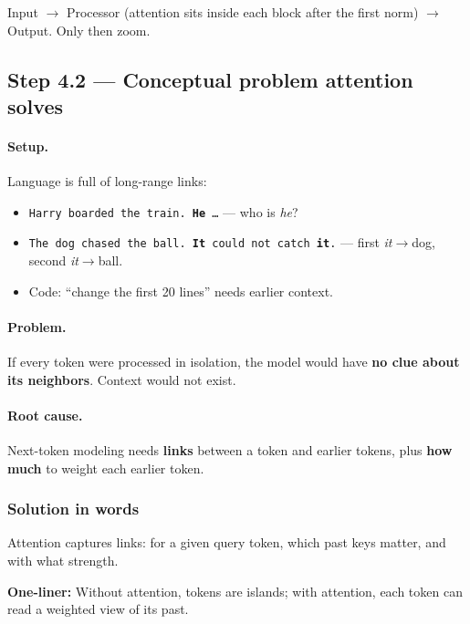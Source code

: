 \documentclass[11pt,a4paper]{article}
\begin{document}
Input $\rightarrow$ Processor (attention sits inside each block after the first norm) $\rightarrow$ Output. Only then zoom.


\subsection{Step 4.2 --- Conceptual problem attention solves}


\paragraph{Setup.}

Language is full of long-range links:

\begin{itemize}
\item \texttt{Harry boarded the train. \textbf{He} \ldots{}} --- who is \textit{he}?  
\item \texttt{The dog chased the ball. \textbf{It} could not catch \textbf{it}.} --- first \textit{it}$\rightarrow$dog, second \textit{it}$\rightarrow$ball.  
\item Code: ``change the first 20 lines'' needs earlier context.
\end{itemize}


\paragraph{Problem.}

If every token were processed in isolation, the model would have \textbf{no clue about its neighbors}. Context would not exist.


\paragraph{Root cause.}

Next-token modeling needs \textbf{links} between a token and earlier tokens, plus \textbf{how much} to weight each earlier token.


\subsubsection{Solution in words}

Attention captures links: for a given query token, which past keys matter, and with what strength.


\textbf{One-liner:} Without attention, tokens are islands; with attention, each token can read a weighted view of its past.
\end{document}
